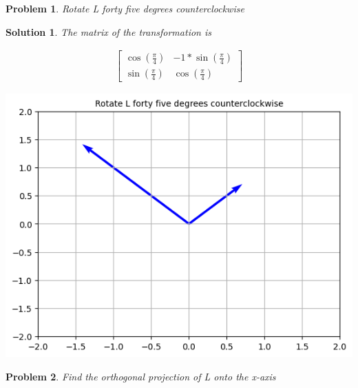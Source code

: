 \documentclass{article}
\newtheorem{problem}{Problem}
\newtheorem*{solution}{Solution}
\begin{document}
\begin{problem}
Rotate L forty five degrees counterclockwise
\end{problem}

\begin{solution}
The matrix of the transformation is 

\begin{align*}
\begin{bmatrix}
\cos(\frac{\pi}{4}) & -1 * \sin(\frac{\pi}{4}) \\ 
\sin(\frac{\pi}{4}) & \cos(\frac{\pi}{4})
\end{bmatrix}
\end{align*}

\includegraphics[scale=0.5, center]{Lrot45} 
\end{solution}

\begin{problem}
Find the orthogonal projection of L onto the x-axis
\end{problem}
\end{document}
